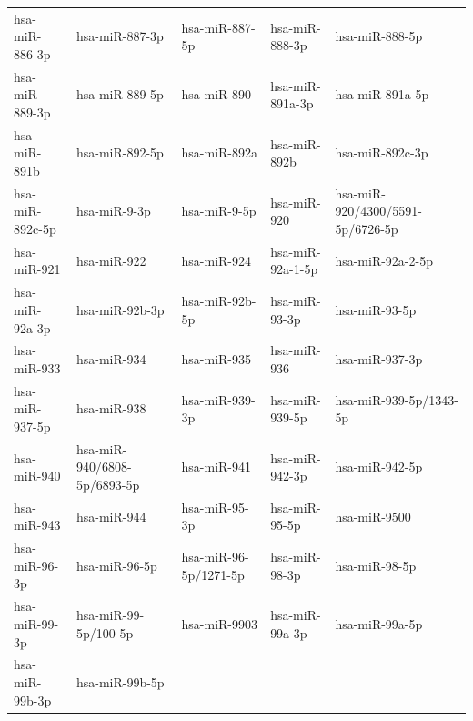 \begin{longtable}{lllll}
hsa-miR-886-3p & hsa-miR-887-3p & hsa-miR-887-5p & hsa-miR-888-3p & hsa-miR-888-5p \\
hsa-miR-889-3p & hsa-miR-889-5p & hsa-miR-890 & hsa-miR-891a-3p & hsa-miR-891a-5p \\
hsa-miR-891b & hsa-miR-892-5p & hsa-miR-892a & hsa-miR-892b & hsa-miR-892c-3p \\
hsa-miR-892c-5p & hsa-miR-9-3p & hsa-miR-9-5p & hsa-miR-920 & hsa-miR-920/4300/5591-5p/6726-5p \\
hsa-miR-921 & hsa-miR-922 & hsa-miR-924 & hsa-miR-92a-1-5p & hsa-miR-92a-2-5p \\
hsa-miR-92a-3p & hsa-miR-92b-3p & hsa-miR-92b-5p & hsa-miR-93-3p & hsa-miR-93-5p \\
hsa-miR-933 & hsa-miR-934 & hsa-miR-935 & hsa-miR-936 & hsa-miR-937-3p \\
hsa-miR-937-5p & hsa-miR-938 & hsa-miR-939-3p & hsa-miR-939-5p & hsa-miR-939-5p/1343-5p \\
hsa-miR-940 & hsa-miR-940/6808-5p/6893-5p & hsa-miR-941 & hsa-miR-942-3p & hsa-miR-942-5p \\
hsa-miR-943 & hsa-miR-944 & hsa-miR-95-3p & hsa-miR-95-5p & hsa-miR-9500 \\
hsa-miR-96-3p & hsa-miR-96-5p & hsa-miR-96-5p/1271-5p & hsa-miR-98-3p & hsa-miR-98-5p \\
hsa-miR-99-3p & hsa-miR-99-5p/100-5p & hsa-miR-9903 & hsa-miR-99a-3p & hsa-miR-99a-5p \\
hsa-miR-99b-3p & hsa-miR-99b-5p &  &  &  \\
\end{longtable}
